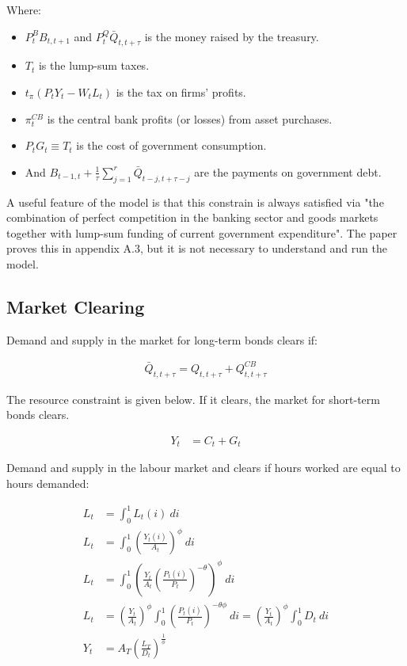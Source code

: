 \documentclass[12pt]{article}
\begin{document}
Where:

\begin{itemize}
    \item $P_{t}^{B}B_{t,t+1}$ and $P_{t}^{Q}\bar{Q}_{t,t+\tau}$ is the money raised by the treasury.
    \item $T_{t}$ is the lump-sum taxes.
    \item $t_{\pi}(P_{t}Y_{t}-W_{t}L_{t})$ is the tax on firms' profits.
    \item $\pi^{CB}_t$ is the central bank profits (or losses) from asset purchases.
    \item $P_{t}G_{t} \equiv T_{t}$ is the cost of government consumption.
    \item And $B_{t-1,t}+{\frac{1}{\tau}}\sum_{j=1}^{r}\bar{Q}_{t-j,t+\tau-j}$ are the payments on government debt.
\end{itemize}

A useful feature of the model is that this constrain is always satisfied via "the combination of perfect competition in the banking sector and goods markets together with lump-sum funding of current government expenditure". The paper proves this in appendix A.3, but it is not necessary to understand and run the model.



\subsection{Market Clearing}

Demand and supply in the market for long-term bonds clears if:

\begin{align*}
    \bar Q_{t,t+\tau} = Q_{t,t+\tau} + Q^{CB}_{t,t+\tau} \tag{23}
\end{align*}

The resource constraint is given below. If it clears, the market for short-term bonds clears.

\begin{align*}
    Y_t &= C_t + G_t \tag{24}
\end{align*}


Demand and supply in the labour market and clears if hours worked are equal to hours demanded:

\begin{align*}
    L_t &= \int^1_0 L_t(i) ~di\\
    L_t &= \int^1_0 \left(\frac{Y_t(i)}{A_t}\right)^\phi ~di\\
    L_t &= \int^1_0 \left(\frac{Y_t}{A_t}\left(\frac{P_t(i)}{P_t}\right)^{-\theta}\right)^\phi ~di\\
    L_t &= \left(\frac{Y_t}{A_t}\right)^\phi\int^1_0 \left(\frac{P_t(i)}{P_t}\right)^{-\theta\phi} ~di = \left(\frac{Y_t}{A_t}\right)^\phi\int^1_0 D_t ~di\\
    Y_t &= A_T \left(\frac{L_T}{D_t}\right)^\frac{1}{\phi} \tag{24}
\end{align*}
\end{document}
